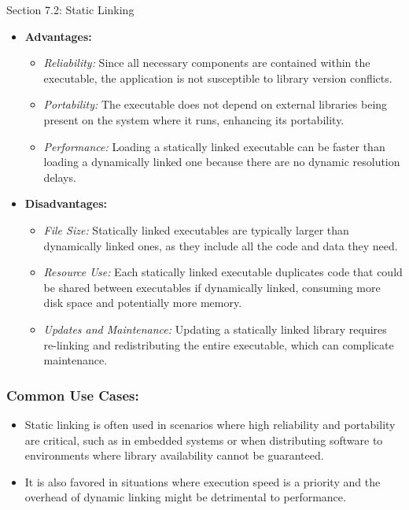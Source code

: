 \begin{notes}{Section 7.2: Static Linking}
    \begin{itemize}
        \item \textbf{Advantages:}
            \begin{itemize}
                \item \emph{Reliability:} Since all necessary components are contained within the executable, the application is not susceptible to library version conflicts.
                \item \emph{Portability:} The executable does not depend on external libraries being present on the system where it runs, enhancing its portability.
                \item \emph{Performance:} Loading a statically linked executable can be faster than loading a dynamically linked one because there are no dynamic resolution delays.
            \end{itemize}
        \item \textbf{Disadvantages:}
            \begin{itemize}
                \item \emph{File Size:} Statically linked executables are typically larger than dynamically linked ones, as they include all the code and data they need.
                \item \emph{Resource Use:} Each statically linked executable duplicates code that could be shared between executables if dynamically linked, consuming more disk space and potentially more memory.
                \item \emph{Updates and Maintenance:} Updating a statically linked library requires re-linking and redistributing the entire executable, which can complicate maintenance.
            \end{itemize}
    \end{itemize}
    
    \subsubsection*{Common Use Cases:}
    
    \begin{itemize}
        \item Static linking is often used in scenarios where high reliability and portability are critical, such as in embedded systems or when distributing software to environments where library 
        availability cannot be guaranteed.
        \item It is also favored in situations where execution speed is a priority and the overhead of dynamic linking might be detrimental to performance.
    \end{itemize}
\end{notes}

